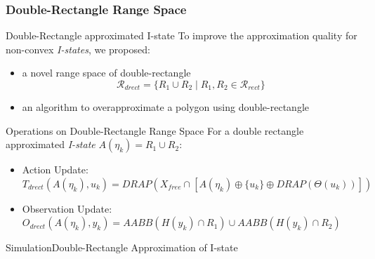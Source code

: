 \documentclass[10pt]{beamer}
\begin{document}
\subsubsection[Double-Rectangle Range Space]{Double-Rectangle Range Space}
\begin{frame}{Double-Rectangle approximated I-state}
  To improve the approximation quality for non-convex \emph{I-states}, we
  proposed:
  \begin{itemize}
  \item a novel range space of \textcolor[rgb]{1.00,0.00,0.00}{double-rectangle}
    \begin{equation}
      \mathcal{R}_{drect} = \{ R_1 \cup R_2 \mid R_1, R_2 \in \mathcal{R}_{rect} \}
    \end{equation}
  \item an algorithm to overapproximate a polygon using double-rectangle
    \begin{center}
      
    \end{center} 
  \end{itemize}
  
\end{frame}

\begin{frame}{Operations on Double-Rectangle Range Space}
  For a double rectangle approximated \emph{I-state} $A(\eta_k) = R_1 \cup R_2$:
  \begin{itemize}
  \item \small{Action Update:\\$T_{drect}\left(A(\eta_k), u_k \right)=DRAP\left(X_{free} \cap [A(\eta_k) \oplus \{ u_k \} \oplus DRAP\left(\Theta(u_k)\right)]\right)$}
  \item \small{Observation Update:\\$O_{drect}\left(A(\eta_k), y_k\right)=AABB\left(H(y_k) \cap R_1\right)\cup AABB\left(H(y_k) \cap R_2\right)$}
  \end{itemize}
  \begin{center}  
    
  \end{center}
\end{frame}

\begin{frame}{Simulation}{Double-Rectangle Approximation of I-state}
  \begin{center}
  \end{center}
\end{frame} 
\end{document}
